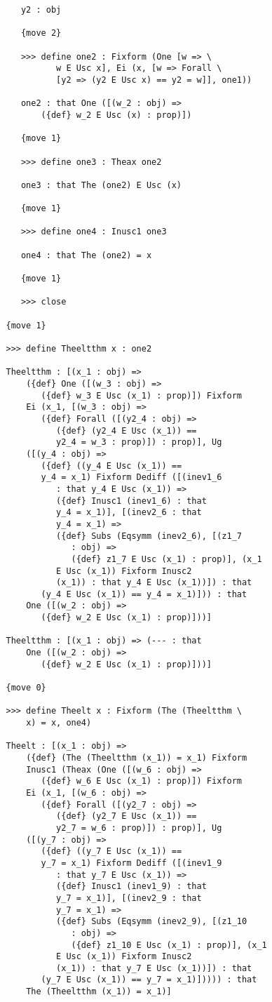 \documentclass[12pt]{article}
\begin{document}
\begin{verbatim}
      y2 : obj

      {move 2}

      >>> define one2 : Fixform (One [w => \
             w E Usc x], Ei (x, [w => Forall \
             [y2 => (y2 E Usc x) == y2 = w]], one1))

      one2 : that One ([(w_2 : obj) => 
          ({def} w_2 E Usc (x) : prop)])

      {move 1}

      >>> define one3 : Theax one2

      one3 : that The (one2) E Usc (x)

      {move 1}

      >>> define one4 : Inusc1 one3

      one4 : that The (one2) = x

      {move 1}

      >>> close

   {move 1}

   >>> define Theeltthm x : one2

   Theeltthm : [(x_1 : obj) => 
       ({def} One ([(w_3 : obj) => 
          ({def} w_3 E Usc (x_1) : prop)]) Fixform 
       Ei (x_1, [(w_3 : obj) => 
          ({def} Forall ([(y2_4 : obj) => 
             ({def} (y2_4 E Usc (x_1)) == 
             y2_4 = w_3 : prop)]) : prop)], Ug 
       ([(y_4 : obj) => 
          ({def} ((y_4 E Usc (x_1)) == 
          y_4 = x_1) Fixform Dediff ([(inev1_6 
             : that y_4 E Usc (x_1)) => 
             ({def} Inusc1 (inev1_6) : that 
             y_4 = x_1)], [(inev2_6 : that 
             y_4 = x_1) => 
             ({def} Subs (Eqsymm (inev2_6), [(z1_7 
                : obj) => 
                ({def} z1_7 E Usc (x_1) : prop)], (x_1 
             E Usc (x_1)) Fixform Inusc2 
             (x_1)) : that y_4 E Usc (x_1))]) : that 
          (y_4 E Usc (x_1)) == y_4 = x_1)])) : that 
       One ([(w_2 : obj) => 
          ({def} w_2 E Usc (x_1) : prop)]))]

   Theeltthm : [(x_1 : obj) => (--- : that 
       One ([(w_2 : obj) => 
          ({def} w_2 E Usc (x_1) : prop)]))]

   {move 0}

   >>> define Theelt x : Fixform (The (Theeltthm \
       x) = x, one4)

   Theelt : [(x_1 : obj) => 
       ({def} (The (Theeltthm (x_1)) = x_1) Fixform 
       Inusc1 (Theax (One ([(w_6 : obj) => 
          ({def} w_6 E Usc (x_1) : prop)]) Fixform 
       Ei (x_1, [(w_6 : obj) => 
          ({def} Forall ([(y2_7 : obj) => 
             ({def} (y2_7 E Usc (x_1)) == 
             y2_7 = w_6 : prop)]) : prop)], Ug 
       ([(y_7 : obj) => 
          ({def} ((y_7 E Usc (x_1)) == 
          y_7 = x_1) Fixform Dediff ([(inev1_9 
             : that y_7 E Usc (x_1)) => 
             ({def} Inusc1 (inev1_9) : that 
             y_7 = x_1)], [(inev2_9 : that 
             y_7 = x_1) => 
             ({def} Subs (Eqsymm (inev2_9), [(z1_10 
                : obj) => 
                ({def} z1_10 E Usc (x_1) : prop)], (x_1 
             E Usc (x_1)) Fixform Inusc2 
             (x_1)) : that y_7 E Usc (x_1))]) : that 
          (y_7 E Usc (x_1)) == y_7 = x_1)])))) : that 
       The (Theeltthm (x_1)) = x_1)]


\end{verbatim}
\end{document}
